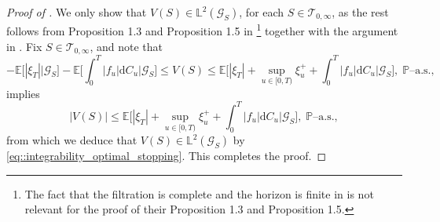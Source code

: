 \documentclass[10pt]{article} %
\newcommand\cG{\mathcal G}
\newcommand\cT{\mathcal T}
\def \E{\mathbb{E}}
\def \L{\mathbb{L}}
\def \P{\mathbb{P}}
\def\d{\mathrm{d}}
\begin{document}
\begin{proof}[Proof of ]
	We only show that $V(S) \in \L^2(\cG_S)$, for each $S \in \cT_{0,\infty}$, as the rest follows from Proposition 1.3 and Proposition 1.5 in \cite{kobylanski2012optimal}\footnote{The fact that the filtration is complete and the horizon is finite in \cite{kobylanski2012optimal} is not relevant for the proof of their Proposition 1.3 and Proposition 1.5.} together with the argument in \cite[Footnote 4]{grigorova2020optimal}. Fix $S \in \cT_{0,\infty}$, and note that
	\begin{equation*}
		-\E\big[|\xi_T|\big| \cG_S\big] - \E\bigg[\int_0^T|f_u|\d C_u \bigg| \cG_S\bigg] \leq V(S) \leq \E\bigg[ |\xi_T| + \sup_{u \in [0,T)} \xi^+_{u} + \int_0^T |f_u| \d C_u \bigg|\cG_S\bigg], \; \text{$\P$--a.s.},
	\end{equation*}
	implies
	\begin{equation*}
		|V(S)| \leq \E\bigg[ |\xi_T| + \sup_{u \in [0,T)} \xi^+_u + \int_0^T |f_u| \d C_u \bigg|\cG_S\bigg], \; \text{$\P$--a.s.},
	\end{equation*}
	from which we deduce that $V(S) \in \L^2(\cG_S)$ by \eqref{eq::integrability_optimal_stopping}. This completes the proof.
\end{proof}
\end{document}
